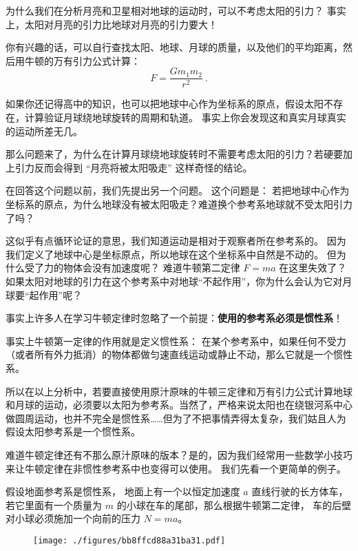 
为什么我们在分析月亮和卫星相对地球的运动时，可以不考虑太阳的引力？ 事实上，太阳对月亮的引力比地球对月亮的引力要大！

你有兴趣的话，可以自行查找太阳、地球、月球的质量，以及他们的平均距离，然后用牛顿的万有引力公式计算：
\begin{equation}
F = \frac{Gm_1m_2}{r^2}~.
\end{equation}

如果你还记得高中的知识，也可以把地球中心作为坐标系的原点，假设太阳不存在，计算验证月球绕地球旋转的周期和轨道。 事实上你会发现这和真实月球真实的运动所差无几。

那么问题来了，为什么在计算月球绕地球旋转时不需要考虑太阳的引力？若硬要加上引力反而会得到 “月亮将被太阳吸走” 这样奇怪的结论。

在回答这个问题以前，我们先提出另一个问题。 这个问题是： 若把地球中心作为坐标系的原点，为什么地球没有被太阳吸走？难道换个参考系地球就不受太阳引力了吗？

这似乎有点循环论证的意思，我们知道运动是相对于观察者所在参考系的。 因为我们定义了地球中心是坐标原点，所以地球在这个坐标系中自然是不动的。 但为什么受了力的物体会没有加速度呢？ 难道牛顿第二定律 $F = ma$ 在这里失效了？ 如果太阳对地球的引力在这个参考系中对地球“不起作用”，你为什么会认为它对月球要“起作用”呢？

事实上许多人在学习牛顿定律时忽略了一个前提：\textbf{使用的参考系必须是惯性系}！

事实上牛顿第一定律的作用就是定义惯性系： 在某个参考系中，如果任何不受力（或者所有外力抵消）的物体都做匀速直线运动或静止不动，那么它就是一个惯性系。

所以在以上分析中，若要直接使用原汁原味的牛顿三定律和万有引力公式计算地球和月球的运动，必须要以太阳为参考系。当然了，严格来说太阳也在绕银河系中心做圆周运动，也并不完全是惯性系……但为了不把事情弄得太复杂，我们姑且人为假设太阳参考系是一个惯性系。

难道牛顿定律还有不那么原汁原味的版本？是的，因为我们经常用一些数学小技巧来让牛顿定律在非惯性参考系中也变得可以使用。 我们先看一个更简单的例子。

假设地面参考系是惯性系， 地面上有一个以恒定加速度 $a$ 直线行驶的长方体车， 若它里面有一个质量为 $m$ 的小球在车的尾部，那么根据牛顿第二定律， 车的后壁对小球必须施加一个向前的压力 $N = ma$。

\begin{figure}[ht]
\centering
\texttt{[image: ./figures/bb8ffcd88a31ba31.pdf]}
\caption{} \label{fig_EquivI_1}
\end{figure}

